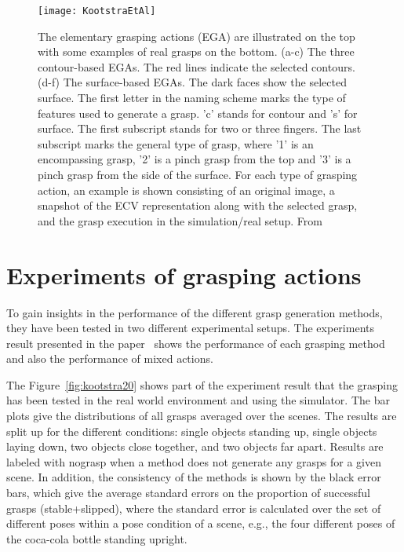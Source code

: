 \begin{figure}
	\centering
	\texttt{[image: KootstraEtAl]}
	\caption{The elementary grasping actions (EGA) are illustrated on the top with some examples of real grasps on the bottom. (a-c) The three contour-based EGAs. The red lines indicate the selected contours. (d-f) The surface-based EGAs. The dark faces show the selected surface. The first letter in the naming scheme marks the type of features used to generate a grasp. ’c’ stands for contour and ’s’ for surface. The first subscript stands for two or three fingers. The last subscript marks the general type of grasp, where ’1’ is an encompassing grasp, ’2’ is a pinch grasp from the top and ’3’ is a pinch grasp from the side of the surface. For each type of grasping action, an example is shown consisting of an original image, a snapshot of the ECV representation along with the selected grasp, and the grasp execution in the simulation/real setup. From~\cite{kootstra}}
	\label{fig:kootstra1}
\end{figure}

\section{Experiments of grasping actions}
To gain insights in the performance of the different grasp generation methods, they have been tested in two different experimental setups.
The experiments result presented in the paper~\cite{kootstra} shows the performance of each grasping method and also the performance of mixed actions. 

The Figure~\vref{fig:kootstra20} shows part of the experiment result that the grasping has been tested in the real world environment and using the simulator. 
The bar plots give the distributions of all grasps averaged over the scenes. 
The results are split up for the different conditions: single objects standing up, single objects laying down, two objects close together, and two objects far apart. 
Results are labeled with nograsp when a method does not generate any grasps for a given scene. 
In addition, the consistency of the methods is shown by the black error bars, 
which give the average standard errors on the proportion of successful grasps (stable+slipped), 
where the standard error is calculated over the set of different poses within a pose condition of a scene, 
e.g., the four different poses of the coca-cola bottle standing upright.

